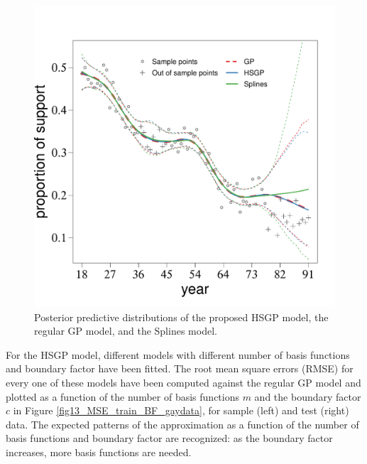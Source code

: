 \documentclass[]{interact}
\theoremstyle{plain}%
\theoremstyle{definition}
\theoremstyle{remark}
\begin{document}
\begin{figure}
\centering
\includegraphics[scale=0.50]{fig12_Posteriors_gaydata.pdf}
\caption{Posterior predictive distributions of the proposed HSGP model, the regular GP model, and the Splines model.}
  \label{fig12_Posteriors_gaydata}
\end{figure}

For the HSGP model, different models with different number of basis functions and boundary factor have been fitted. The root mean square errors (RMSE) for every one of these models have been computed against the regular GP model and plotted as a function of the number of basis functions $m$ and the boundary factor $c$ in Figure \ref{fig13_MSE_train_BF_gaydata}, for sample (left) and test (right) data. The expected patterns of the approximation as a function of the number of basis functions and boundary factor are recognized: as the boundary factor increases, more basis functions are needed.
\end{document}
